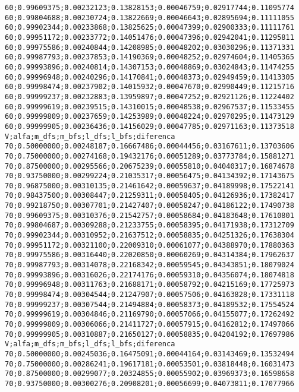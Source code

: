 \documentclass[brazil,times]{abnt}
\begin{document}
{\begin{verbatim}
60;0.99609375;0.00232123;0.13828153;0.00046759;0.02917744;0.11095774
60;0.99804688;0.00230724;0.13822669;0.00046643;0.02895694;0.11111055
60;0.99902344;0.00233868;0.13825625;0.00047399;0.02900333;0.11111761
60;0.99951172;0.00233772;0.14051476;0.00047396;0.02942041;0.11295811
60;0.99975586;0.00240844;0.14208985;0.00048202;0.03030296;0.11371331
60;0.99987793;0.00237853;0.14190369;0.00048252;0.02974604;0.11405365
60;0.99993896;0.00240814;0.14307153;0.00048869;0.03024843;0.11474255
60;0.99996948;0.00240296;0.14170841;0.00048373;0.02949459;0.11413305
60;0.99998474;0.00237902;0.14015932;0.00047670;0.02990449;0.11215716
60;0.99999237;0.00232883;0.13959897;0.00047252;0.02921126;0.11224402
60;0.99999619;0.00239515;0.14310015;0.00048538;0.02967537;0.11533455
60;0.99999809;0.00237659;0.14253989;0.00048224;0.02970295;0.11473129
60;0.99999905;0.00236436;0.14156029;0.00047785;0.02971163;0.11373518
V;alfa;m_dfs;m_bfs;l_dfs;l_bfs;diferenca
70;0.50000000;0.00248187;0.16667486;0.00044456;0.03167611;0.13703606
70;0.75000000;0.00274168;0.19432176;0.00051289;0.03773784;0.15881271
70;0.87500000;0.00295566;0.20675239;0.00055810;0.04040317;0.16874678
70;0.93750000;0.00299224;0.21035317;0.00056475;0.04134392;0.17143675
70;0.96875000;0.00310135;0.21461642;0.00059637;0.04189998;0.17522141
70;0.98437500;0.00308447;0.21259311;0.00058405;0.04126936;0.17382417
70;0.99218750;0.00307701;0.21427407;0.00058247;0.04186122;0.17490738
70;0.99609375;0.00310376;0.21542757;0.00058684;0.04183648;0.17610801
70;0.99804687;0.00309288;0.21233755;0.00058395;0.04171938;0.17312709
70;0.99902344;0.00310952;0.21637512;0.00058835;0.04251326;0.17638304
70;0.99951172;0.00321100;0.22009310;0.00061077;0.04388970;0.17880363
70;0.99975586;0.00316440;0.22020850;0.00060269;0.04314384;0.17962637
70;0.99987793;0.00314078;0.22168342;0.00059545;0.04343851;0.18079024
70;0.99993896;0.00316026;0.22174176;0.00059310;0.04356074;0.18074818
70;0.99996948;0.00311763;0.21688171;0.00058792;0.04215169;0.17725973
70;0.99998474;0.00304544;0.21247907;0.00057506;0.04163828;0.17331118
70;0.99999237;0.00307544;0.21494884;0.00058373;0.04189532;0.17554524
70;0.99999619;0.00304846;0.21169790;0.00057066;0.04155077;0.17262492
70;0.99999809;0.00306066;0.21411727;0.00057915;0.04162812;0.17497066
70;0.99999905;0.00310887;0.21650127;0.00058835;0.04204192;0.17697986
V;alfa;m_dfs;m_bfs;l_dfs;l_bfs;diferenca
70;0.50000000;0.00245036;0.16475091;0.00044164;0.03143469;0.13532494
70;0.75000000;0.00286241;0.19617181;0.00053501;0.03818448;0.16031473
70;0.87500000;0.00299077;0.20324855;0.00055902;0.03969373;0.16598658
70;0.93750000;0.00300276;0.20908201;0.00056699;0.04073811;0.17077966

\end{verbatim}}
\end{document}
